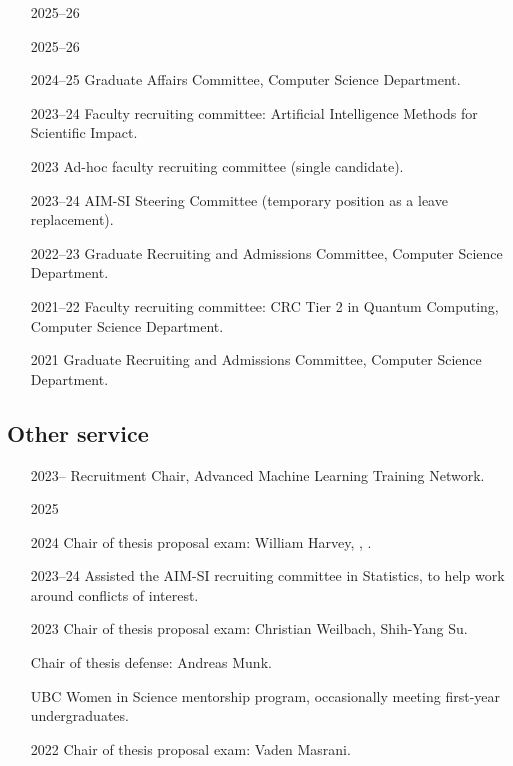 \documentclass[10pt]{article}
\begin{document}
\begin{itemize}[leftmargin=5em]
  \item[2025--26] 
  \item[2025--26] 
  \item[2024--25] {Graduate Affairs Committee, Computer Science Department.}
  \item[2023--24] {Faculty recruiting committee: Artificial Intelligence Methods for Scientific Impact.}
  \item[2023] {Ad-hoc faculty recruiting committee (single candidate).}
  \item[2023--24] {AIM-SI Steering Committee (temporary position as a leave replacement).}
  \item[2022--23] Graduate Recruiting and Admissions Committee, Computer Science Department.
  \item[2021--22] Faculty recruiting committee: CRC Tier 2 in Quantum Computing, Computer Science Department.
  \item[2021] Graduate Recruiting and Admissions Committee, Computer Science Department.
\end{itemize}

\subsection{Other service} %

\begin{itemize}[leftmargin=5em]
  \item[2023--] {Recruitment Chair, Advanced Machine Learning Training Network.}
  \item[2025] 
  \item[2024] Chair of thesis proposal exam: William Harvey, , .
  \item[2023--24] {Assisted the AIM-SI recruiting committee in Statistics, to help work around conflicts of interest.}
  \item[2023] Chair of thesis proposal exam: Christian Weilbach, Shih-Yang Su.
  \item[] Chair of thesis defense: Andreas Munk.
  \item[] UBC Women in Science mentorship program, occasionally meeting first-year undergraduates.
  \item[2022] Chair of thesis proposal exam: Vaden Masrani.
\end{itemize}
\end{document}
